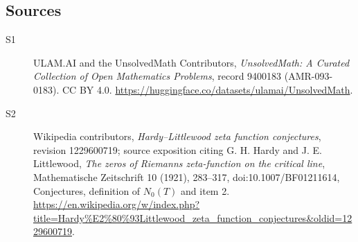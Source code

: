 \documentclass[11pt]{article}
\begin{document}
\subsection{Sources}
\begin{description}
\item[\hypertarget{source:9400183:1}{S1}] ULAM.AI and the UnsolvedMath Contributors, \emph{UnsolvedMath: A Curated Collection of Open Mathematics Problems}, record 9400183 (AMR-093-0183). CC BY 4.0. \url{https://huggingface.co/datasets/ulamai/UnsolvedMath}.
\item[\hypertarget{source:9400183:2}{S2}] Wikipedia contributors, \emph{Hardy--Littlewood zeta function conjectures}, revision 1229600719; source exposition citing G. H. Hardy and J. E. Littlewood, \emph{The zeros of Riemann\textquotesingle s zeta-function on the critical line}, Mathematische Zeitschrift 10 (1921), 283--317, doi:10.1007/BF01211614, Conjectures, definition of $N_0(T)$ and item 2. \url{https://en.wikipedia.org/w/index.php?title=Hardy%E2%80%93Littlewood_zeta_function_conjectures&oldid=1229600719}.
\end{description}
\label{end:9400183}
\end{document}
